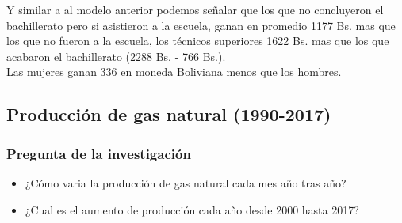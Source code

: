 \begin{multicols}{2}
Y similar a al modelo anterior podemos señalar que los que no concluyeron el bachillerato pero si asistieron a la escuela, ganan en promedio 1177 Bs. mas que los que no fueron a la escuela, los técnicos superiores 1622 Bs. mas que los que acabaron el bachillerato (2288 Bs. - 766 Bs.). 
\\ Las mujeres ganan 336 en moneda Boliviana menos que los hombres.
\end{multicols}
\newpage
\subsection*{\center Producción de gas natural (1990-2017)}

\begin{multicols}{2}
\subsubsection*{Pregunta de la investigación}
\begin{center}
    \begin{itemize}
	\item ¿Cómo varia la producción de gas natural cada mes año tras año?
	\item ¿Cual es el aumento de producción cada año desde 2000 hasta 2017?
    \end{itemize}
\end{center}


\end{multicols}
